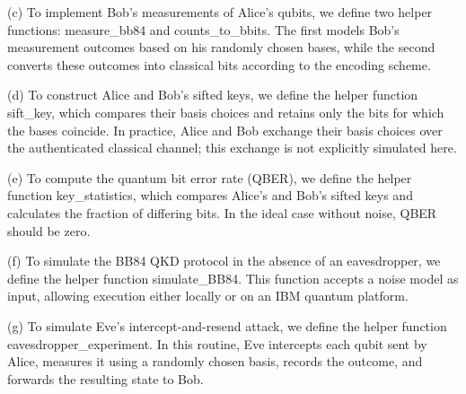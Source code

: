 (c) To implement Bob’s measurements of Alice’s qubits, we define two helper functions: measure\_bb84 and counts\_to\_bbits. The first models Bob’s measurement outcomes based on his randomly chosen bases, while the second converts these outcomes into classical bits according to the encoding scheme.

(d) To construct Alice and Bob's sifted keys, we define the helper function sift\_key, which compares their basis choices and retains only the bits for which the bases coincide. In practice, Alice and Bob exchange their basis choices over the authenticated classical channel; this exchange is not explicitly simulated here.

(e) To compute the quantum bit error rate (QBER), we define the helper function key\_statistics, which compares Alice’s and Bob’s sifted keys and calculates the fraction of differing bits. In the ideal case without noise, QBER should be zero.

(f) To simulate the BB84 QKD protocol in the absence of an eavesdropper, we define the helper function simulate\_BB84. This function accepts a noise model as input, allowing execution either locally or on an IBM quantum platform.

(g) To simulate Eve’s intercept-and-resend attack, we define the helper function eavesdropper\_experiment. In this routine, Eve intercepts each qubit sent by Alice, measures it using a randomly chosen basis, records the outcome, and forwards the resulting state to Bob.

